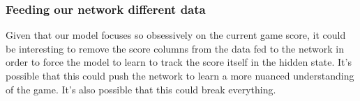 \subsubsection{Feeding our network different data}

Given that our model focuses so obsessively on the current game score, it could be interesting to remove the score columns from the data fed to the network in order to force the model to learn to track the score itself in the hidden state. It's possible that this could push the network to learn a more nuanced understanding of the game. It's also possible that this could break everything.
